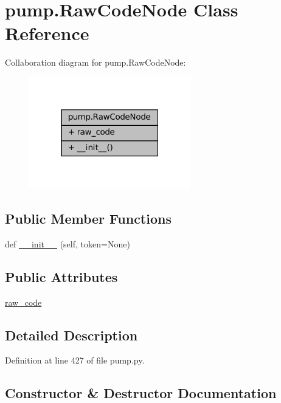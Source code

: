 \hypertarget{classpump_1_1RawCodeNode}{}\section{pump.\+Raw\+Code\+Node Class Reference}
\label{classpump_1_1RawCodeNode}


Collaboration diagram for pump.\+Raw\+Code\+Node\+:
\nopagebreak
\begin{figure}[H]
\begin{center}
\leavevmode
\includegraphics[width=199pt]{classpump_1_1RawCodeNode__coll__graph}
\end{center}
\end{figure}
\subsection*{Public Member Functions}
\begin{DoxyCompactItemize}
\item 
def \hyperlink{classpump_1_1RawCodeNode_a7ba81f4da42d4e96a89713032867f87f}{\+\_\+\+\_\+init\+\_\+\+\_\+} (self, token=None)
\end{DoxyCompactItemize}
\subsection*{Public Attributes}
\begin{DoxyCompactItemize}
\item 
\hyperlink{classpump_1_1RawCodeNode_ab36224d959e0d8f803e9fac8e6a0baab}{raw\+\_\+code}
\end{DoxyCompactItemize}


\subsection{Detailed Description}


Definition at line 427 of file pump.\+py.



\subsection{Constructor \& Destructor Documentation}
\mbox{\label{classpump_1_1RawCodeNode_a7ba81f4da42d4e96a89713032867f87f}} 
